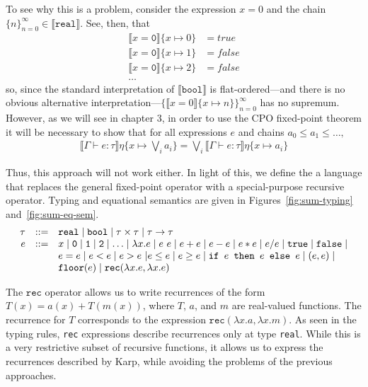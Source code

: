 To see why this is a problem, consider the expression $x = 0$ and the chain $\{n\}_{n=0}^{\infty} \in \llbracket 
\texttt{real} \rrbracket$. See, then, that
\begin{align*}
\llbracket x = \texttt{0} \rrbracket\{x \mapsto 0\} &= true \\
\llbracket x = \texttt{0} \rrbracket\{x \mapsto 1\} &= false \\
\llbracket x = \texttt{0} \rrbracket\{x \mapsto 2\} &= false \\
\ldots
\end{align*}
so, since the standard interpretation of $\llbracket \texttt{bool} \rrbracket$ is flat-ordered---and there is no obvious
alternative interpretation---$\{\llbracket x = 0\rrbracket\{x \mapsto n\}\}_{n=0}^{\infty}$ has no supremum. However, as we will see in chapter 3,
in order to use the CPO fixed-point theorem it will be necessary to show that for all expressions $e$
and chains $a_0 \leq a_1 \leq \ldots,$
\begin{align*}
  \llbracket \Gamma \vdash e : \tau \rrbracket\eta\{x\mapsto \bigvee_i a_i\}
  = \bigvee_i \llbracket \Gamma \vdash e : \tau \rrbracket\eta\{x \mapsto a_i\}
\end{align*}

Thus, this approach will not work either. In light of this, we define the a language that replaces the general fixed-point 
operator with a special-purpose recursive operator. Typing and equational semantics are given in Figures~\ref{fig:sum-typing} and~\ref{fig:sum-eq-sem}.
\[
\begin{array}{rcl}
\tau &::=& \texttt{real} \mid \texttt{bool} \mid \tau \times \tau \mid \tau \rightarrow \tau \\
e &::=& x  \mid \texttt{0} \mid \texttt{1} \mid \texttt{2} \mid \dotsc \mid \lambda x.e \mid e \ e \mid e + e \mid e - e \mid  e  *  e \mid e / e \mid \texttt{true} \mid \texttt{false} \mid \\
  && e  =  e \mid e < e \mid e > e \ | e \leq e \mid e \geq e \mid 
     \texttt{if } e \texttt{ then } e \texttt{ else } e \mid (e,e) \mid \\
    && \texttt{floor}(e) \mid \texttt{rec}(\lambda x.e, \lambda x.e) 
\end{array}
\]

The $\texttt{rec}$ operator allows us to write 
recurrences of the form $T(x) = a(x) + T(m(x))$, where $T$, $a$, and $m$ are real-valued functions.
The recurrence for $T$ corresponds to the expression $\texttt{rec}(\lambda x.a, \lambda x.m)$. As seen in the typing
rules, \texttt{rec} expressions describe recurrences only at type \texttt{real}.
 While this is a very restrictive subset of recursive functions, it allows us to express the recurrences described by 
Karp, while avoiding the problems of the previous approaches. 

